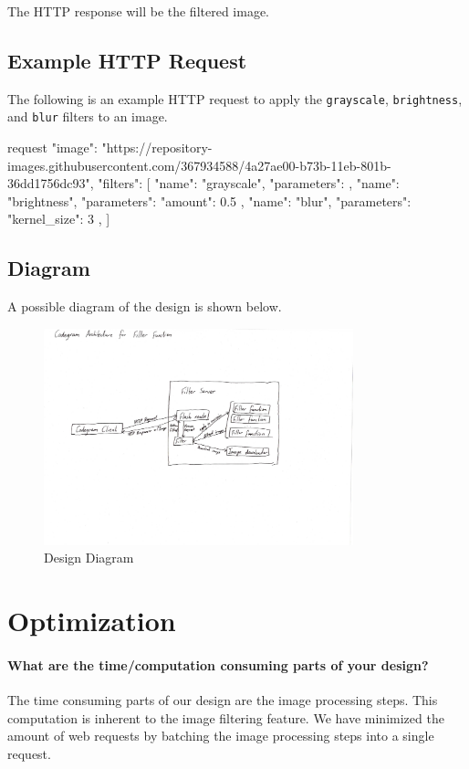 \documentclass{csse4400}
\begin{document}
The HTTP response will be the filtered image.

\subsection{Example HTTP Request}

The following is an example HTTP request to apply the \texttt{grayscale}, \texttt{brightness}, and \texttt{blur} filters to an image.

\begin{code}[language=json]{request}
{
  "image": "https://repository-images.githubusercontent.com/367934588/4a27ae00-b73b-11eb-801b-36dd1756dc93",
  "filters": [
    {
      "name": "grayscale",
      "parameters": {}
    },
    {
      "name": "brightness",
      "parameters": {
        "amount": 0.5
      }
    },
    {
      "name": "blur",
      "parameters": {
        "kernel_size": 3
      }
    },
  ]
}
\end{code}

\subsection{Diagram}

A possible diagram of the design is shown below.

\begin{figure}[h]
    \centering
    \includegraphics[width=0.8\textwidth]{diagram.pdf}
    \caption{Design Diagram}
    \label{fig:diagram}
\end{figure}

\section{Optimization}

\paragraph{What are the time/computation consuming parts of your design?}
The time consuming parts of our design are the image processing steps.
This computation is inherent to the image filtering feature.
We have minimized the amount of web requests by batching the image processing steps into a single request.
\end{document}
